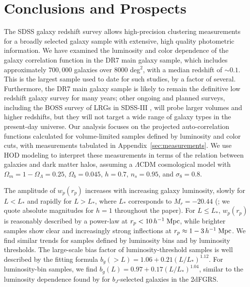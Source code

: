 \documentclass[]{emulateapj}
\newcommand{\hmpc}{\,h^{-1}\;{\rm Mpc}}
\newcommand{\wrp}{{w_p(r_p)}}
\begin{document}
\section{Conclusions and Prospects}
\label{sec:conclusion}

The SDSS galaxy redshift survey allows high-precision clustering measurements 
for a broadly selected galaxy sample with extensive, high quality
photometric information.  We have examined 
the luminosity and color dependence of 
the galaxy correlation function in the DR7 main galaxy sample, which 
includes approximately
$700,000$ galaxies over $8000$ deg$^2$, with a median redshift of 
$\sim 0.1$. This is the largest sample used to date for such studies, 
by a factor of several.  Furthermore, the DR7 main galaxy sample is
likely to remain the definitive low redshift galaxy survey for 
many years; other ongoing and planned surveys, including the BOSS
survey of LRGs in SDSS-III \citep{schlegel09}, will probe larger volumes 
and higher
redshifts, but they will not target a wide range of galaxy types
in the present-day universe.  Our analysis focuses on the
projected auto-correlation functions calculated for volume-limited 
samples defined by luminosity and color cuts, with measurements
tabulated in Appendix~\ref{sec:measurements}.
We use HOD modeling to interpret these measurements in terms of
the relation between galaxies and dark matter halos, assuming a
$\Lambda$CDM cosmological model with $\Omega_m=1-\Omega_\Lambda=0.25$,
$\Omega_b=0.045$, $h=0.7$, $n_s=0.95$, and $\sigma_8=0.8$.

The amplitude of $\wrp$ increases with increasing galaxy luminosity,
slowly for $L<L_*$ and rapidly for $L>L_*$, where $L_*$ corresponds
to $M_r=-20.44$ (\citealt{blanton03c}; we quote absolute magnitudes
for $h=1$ throughout the paper).  For $L \leq L_*$, $\wrp$ is 
reasonably %
described by a power-law at $r_p<10\hmpc$, while brighter samples
show clear and increasingly strong inflections at $r_p \approx 1-3\hmpc$.
We find similar trends for samples defined by luminosity bins and
by luminosity thresholds.  The large-scale bias factor of luminosity-threshold
samples is well described by the fitting formula
$b_g(>L) = 1.06 + 0.21(L/L_*)^{1.12}$.  For luminosity-bin samples,
we find 
$b_g(L) = 0.97+ 0.17(L/L_*)^{1.04}$,
similar to the luminosity dependence found
by \cite{norberg01} for $b_J$-selected galaxies in the 2dFGRS.
\end{document}
